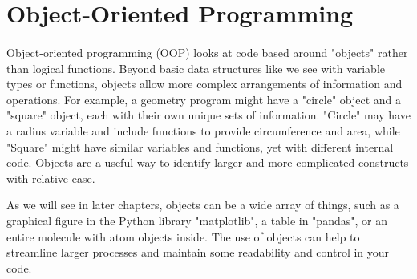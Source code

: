 \section{Object-Oriented Programming}
\paragraph{} Object-oriented programming (OOP) looks at code based around "objects" rather than logical functions.
Beyond basic data structures like we see with variable types or functions, objects allow more complex arrangements of information and operations.  
For example, a geometry program might have a "circle" object and a "square" object, each with their own unique sets of information.
"Circle" may have a radius variable and include functions to provide circumference and area, while "Square" might have similar variables and functions, yet with different internal code.
Objects are a useful way to identify larger and more complicated constructs with relative ease.

As we will see in later chapters, objects can be a wide array of things, such as a graphical figure in the Python library "matplotlib", a table in "pandas", or an entire molecule with atom objects inside.
The use of objects can help to streamline larger processes and maintain some readability and control in your code.